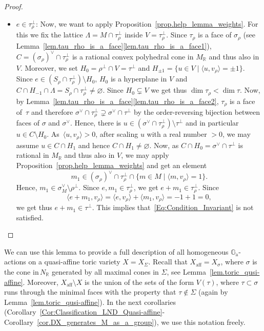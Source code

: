 \documentclass[11pt]{article}
\numberwithin{equation}{section}
\newcommand{\ra}{\mathrm{a}}
\let\oldvee\vee
\renewcommand{\vee}{{\scriptscriptstyle\oldvee}}
\let\oldbot\bot
\renewcommand{\bot}{{\scriptscriptstyle\oldbot}}
\theoremstyle{plain}
\theoremstyle{definition}
\DeclareMathOperator{\aff}{aff}
\newcommand{\GG}{\mathbb{G}}
\newcommand{\RR}{\mathbb{R}}
\newcommand{\set}[2]{\{#1 \mid #2\}}
\newcommand{\sprod}[2]{\langle #1, #2 \rangle}
\begin{document}
\begin{proof}
\begin{enumerate}
\begin{itemize}
\item $e \in \tau_\rho^\bot$:
Now, we want to apply Proposition~\ref{prop.help_lemma_weights}.
For this we fix the lattice $\Lambda = M \cap \tau_{\rho}^\bot$ inside
$V = \tau_{\rho}^\bot$.
Since $\tau_\rho$ is a face of $\sigma_\rho$ (see Lemma~\ref{lem.tau_rho_is_a_face}\eqref{lem.tau_rho_is_a_face1}),
$C =(\sigma_\rho)^\vee \cap \tau_{\rho}^\bot$ is a rational convex polyhedral cone
in $M_\RR$ and thus also in $V$.
Moreover, we set $H_0 = \rho^\bot \cap V = \tau^\bot$
and $H_{\pm1} = \set{u \in V}{\sprod{u}{v_{\rho}} = \pm 1}$.
Since $e \in (S_\rho \cap \tau_\rho^\bot) \setminus H_0$, $H_0$ is a hyperplane in $V$ and
$C \cap H_{-1} \cap \Lambda = S_{\rho} \cap \tau_{\rho}^\bot \neq \varnothing$.
Since $H_0 \subsetneq V$ we get thus $\dim \tau_\rho < \dim \tau$.
Now, by Lemma~\ref{lem.tau_rho_is_a_face}\eqref{lem.tau_rho_is_a_face2},
$\tau_\rho$ is a face of~$\tau$ and therefore
$\sigma^\vee \cap \tau_\rho^\bot \supsetneq \sigma^\vee \cap \tau^\bot$
by the order-reversing bijection between faces of $\sigma$ and
$\sigma^\vee$. Hence,
there is $u \in (\sigma^\vee \cap \tau_\rho^\bot) \setminus \tau^\bot$ and in particular
$u \in C \setminus H_0$. As~$\sprod{u}{v_{\rho}} > 0$, after scaling $u$
with a real number $>0$, we may assume
$u \in C \cap H_1$ and hence $C \cap H_1 \neq \varnothing$.
Now, as $C \cap H_0 = \sigma^\vee \cap \tau^{\bot}$ is rational
in $M_{\RR}$ and thus also in $V$,
we may apply Proposition~\ref{prop.help_lemma_weights} and get an element
\[
m_1 \in (\sigma_\rho)^\vee \cap \tau_{\rho}^\bot \cap \set{m \in M}{\sprod{m}{v_{\rho}}=1}.
\]
Hence, $m_1 \in \sigma_M^\vee \setminus \rho^\bot$.
Since $e, m_1 \in \tau_{\rho}^\bot$, we get
$e + m_1 \in \tau_{\rho}^\bot$. Since
\[
\sprod{e + m_1}{v_{\rho}} = \sprod{e}{v_{\rho}} + \sprod{m_1}{v_{\rho}} = -1 + 1 = 0,
\]
we get thus $e + m_1 \in \tau^\bot$. This implies
that~\eqref{Eq:Condition_Invariant} is not satisfied.\qedhere
\end{itemize}
\end{enumerate}
\end{proof}

We can use this lemma to provide a full description of all homogeneous $\GG_\ra$-actions on a quasi-affine toric variety $X = X_\Sigma$.
Recall that $X_{\aff} = X_\sigma$, where $\sigma$ is the
cone in\,$N_{\RR}$ generated by all maximal cones in $\Sigma$, see
Lemma~\ref{lem.toric_qusi-affine}. Moreover, $X_{\aff} \setminus X$ is the union of the
sets of the form $V(\tau)$, where $\tau \subset \sigma$ runs through the minimal faces with
the property that $\tau \not\in \Sigma$ (again by Lemma~\ref{lem.toric_qusi-affine}).
In the next corollaries (Corollary~\ref{Cor:Classification_LND_Quasi-affine}- Corollary~\ref{cor.DX_generates_M_as_a_group}),
we use this notation freely.
\end{document}
